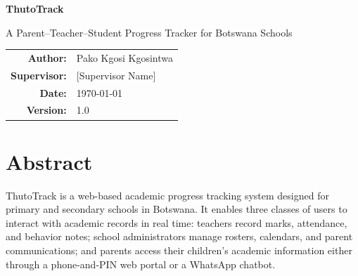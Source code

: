 \documentclass[11pt,a4paper]{article}
\begin{document}
\begin{titlepage}
    \centering
    \vspace*{1.5cm}

    {\Huge\bfseries ThutoTrack\par}
    \vspace{0.5cm}
    {\Large A Parent--Teacher--Student Progress Tracker for Botswana Schools\par}
    \vspace{2cm}


    \vfill

    \begin{tabular}{rl}
        \textbf{Author:}     & Pako Kgosi Kgosintwa \\[4pt]
        \textbf{Supervisor:} & [Supervisor Name] \\[4pt]
        \textbf{Date:}       & \today \\[4pt]
        \textbf{Version:}    & 1.0 \\
    \end{tabular}

    \vspace{2cm}
\end{titlepage}

\section*{Abstract}

ThutoTrack is a web-based academic progress tracking system designed for primary
and secondary schools in Botswana. It enables three classes of users to interact
with academic records in real time: teachers record marks, attendance, and
behavior notes; school administrators manage rosters, calendars, and parent
communications; and parents access their children's academic information either
through a phone-and-PIN web portal or a WhatsApp chatbot.
\end{document}
